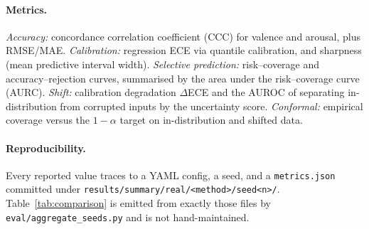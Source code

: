 \paragraph{Metrics.} \emph{Accuracy:} concordance correlation coefficient (CCC)
for valence and arousal, plus RMSE/MAE. \emph{Calibration:} regression ECE via
quantile calibration, and sharpness (mean predictive interval width).
\emph{Selective prediction:} risk--coverage and accuracy--rejection curves,
summarised by the area under the risk--coverage curve (AURC). \emph{Shift:}
calibration degradation $\Delta$ECE and the AUROC of separating in-distribution
from corrupted inputs by the uncertainty score. \emph{Conformal:} empirical
coverage versus the $1-\alpha$ target on in-distribution and shifted data.

\paragraph{Reproducibility.} Every reported value traces to a YAML config, a
seed, and a \texttt{metrics.json} committed under
\texttt{results/summary/real/<method>/seed<n>/}. Table~\ref{tab:comparison} is
emitted from exactly those files by \texttt{eval/aggregate\_seeds.py} and is not
hand-maintained.
